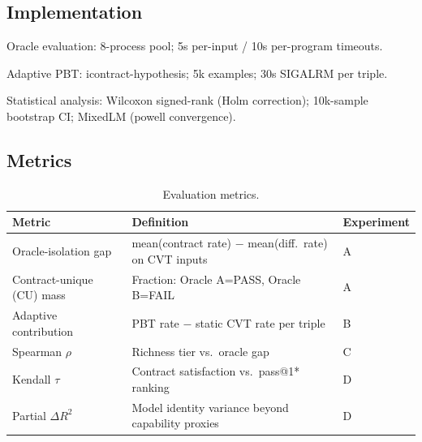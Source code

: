 \subsection{Implementation}

Oracle evaluation: 8-process pool; 5s per-input / 10s per-program timeouts.

Adaptive PBT: icontract-hypothesis; 5k examples; 30s SIGALRM per triple.

Statistical analysis: Wilcoxon signed-rank (Holm correction); 10k-sample bootstrap CI; MixedLM (powell convergence).

\subsection{Metrics}

\begin{table}[h]
\centering
\small
\caption{Evaluation metrics.}
\label{tab:metrics}
\begin{tabular}{lll}
\toprule
Metric & Definition & Experiment \\
\midrule
Oracle-isolation gap & mean(contract rate) $-$ mean(diff.\ rate) on CVT inputs & A \\
Contract-unique (CU) mass & Fraction: Oracle A=PASS, Oracle B=FAIL & A \\
Adaptive contribution & PBT rate $-$ static CVT rate per triple & B \\
Spearman $\rho$ & Richness tier vs.\ oracle gap & C \\
Kendall $\tau$ & Contract satisfaction vs.\ pass@1* ranking & D \\
Partial $\Delta R^2$ & Model identity variance beyond capability proxies & D \\
\bottomrule
\end{tabular}
\end{table}
